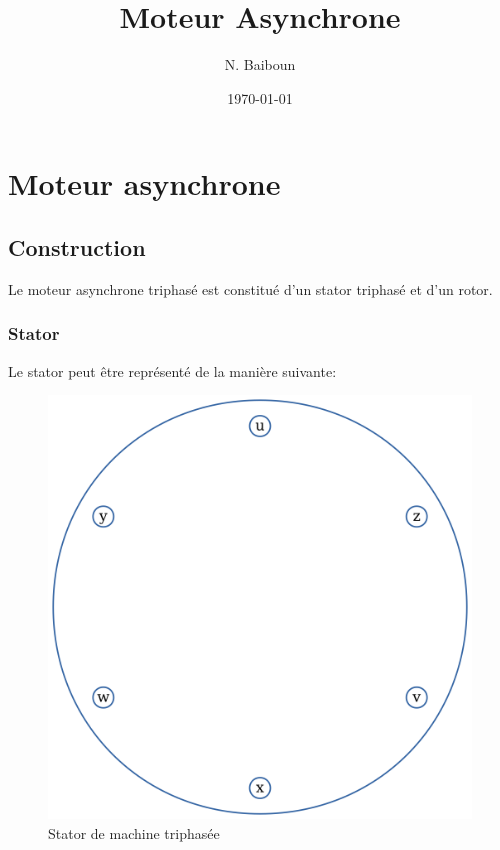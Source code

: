 \documentclass[11pt]{article}
\author{N. Baiboun}
\date{\today}
\title{Moteur Asynchrone}
\begin{document}
    
    \maketitle
    
    

    
    \hypertarget{moteur-asynchrone}{%
\section{Moteur asynchrone}\label{moteur-asynchrone}}

    \hypertarget{construction}{%
\subsection{Construction}\label{construction}}

    Le moteur asynchrone triphasé est constitué d'un stator triphasé et d'un
rotor.

    \hypertarget{stator}{%
\subsubsection{Stator}\label{stator}}

    Le stator peut être représenté de la manière suivante:

    \begin{figure}[!hbt]
        \centering
        \includegraphics{Images/MAS/stator_triphase.png}
        \caption{Stator de machine triphasée}
    \end{figure}
\end{document}
